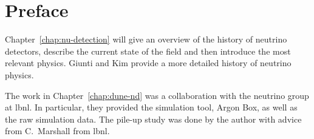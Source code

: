 \renewcommand{\Chapter}{{Preface}}
\chapter*{\Chapter}
\chaptermark{\Chapter}

Chapter~\ref{chap:nu-detection} will give an overview of the history of neutrino detectors, describe the current state of the field and then introduce the most relevant physics.
Giunti and Kim provide a more detailed history of neutrino physics.~\cite{giunti}

The work in Chapter~\ref{chap:dune-nd} was a collaboration with the neutrino group at \gls{lbnl}.
In particular, they provided the simulation tool, Argon Box, as well as the raw simulation data.
The \Pgpz pile-up study was done by the author with advice from C.\ Marshall from \gls{lbnl}.